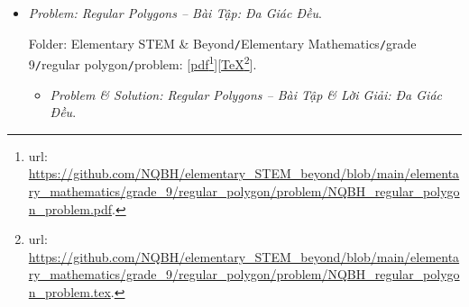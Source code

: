 \documentclass[12pt]{article}
\begin{document}
\begin{itemize}
	Folder: {\sf Elementary STEM \& Beyond{\tt/}Elementary Mathematics{\tt/}grade 9{\tt/}circumcircle \& incircle{\tt/}problem}: [\href{https://github.com/NQBH/elementary_STEM_beyond/blob/main/elementary_mathematics/grade_9/circumcircle_incircle/problem/NQBH_circumcircle_incircle_problem.pdf}{pdf}\footnote{{\sc url}: \url{https://github.com/NQBH/elementary_STEM_beyond/blob/main/elementary_mathematics/grade_9/circumcircle_incircle/problem/NQBH_circumcircle_incircle_problem.pdf}.}][\href{https://github.com/NQBH/elementary_STEM_beyond/blob/main/elementary_mathematics/grade_9/circumcircle_incircle/problem/NQBH_circumcircle_incircle_problem.tex}{\TeX}\footnote{{\sc url}: \url{https://github.com/NQBH/elementary_STEM_beyond/blob/main/elementary_mathematics/grade_9/circumcircle_incircle/problem/NQBH_circumcircle_incircle_problem.tex}.}].
	\begin{itemize}
		\item {\it Problem \& Solution: Circumcircle \& Incircle -- Bài Tập \& Lời Giải: Đường Tròn Ngoại Tiếp \& Đường Tròn Nội Tiếp}.
		
		Folder: {\sf Elementary STEM \& Beyond{\tt/}Elementary Mathematics{\tt/}grade 9{\tt/}circumcircle \& incircle{\tt/}solution}: [\href{https://github.com/NQBH/elementary_STEM_beyond/blob/main/elementary_mathematics/grade_9/circumcircle_incircle/solution/NQBH_circumcircle_incircle_solution.pdf}{pdf}\footnote{{\sc url}: \url{https://github.com/NQBH/elementary_STEM_beyond/blob/main/elementary_mathematics/grade_9/circumcircle_incircle/solution/NQBH_circumcircle_incircle_solution.pdf}.}][\href{https://github.com/NQBH/elementary_STEM_beyond/blob/main/elementary_mathematics/grade_9/circumcircle_incircle/solution/NQBH_circumcircle_incircle_solution.tex}{\TeX}\footnote{{\sc url}: \url{https://github.com/NQBH/elementary_STEM_beyond/blob/main/elementary_mathematics/grade_9/circumcircle_incircle/solution/NQBH_circumcircle_incircle_solution.tex}.}].
	\end{itemize}
	\item {\it Problem: Regular Polygons -- Bài Tập: Đa Giác Đều}.
	
	Folder: {\sf Elementary STEM \& Beyond{\tt/}Elementary Mathematics{\tt/}grade 9{\tt/}regular polygon{\tt/}problem}: [\href{https://github.com/NQBH/elementary_STEM_beyond/blob/main/elementary_mathematics/grade_9/regular_polygon/problem/NQBH_regular_polygon_problem.pdf}{pdf}\footnote{{\sc url}: \url{https://github.com/NQBH/elementary_STEM_beyond/blob/main/elementary_mathematics/grade_9/regular_polygon/problem/NQBH_regular_polygon_problem.pdf}.}][\href{https://github.com/NQBH/elementary_STEM_beyond/blob/main/elementary_mathematics/grade_9/regular_polygon/problem/NQBH_regular_polygon_problem.tex}{\TeX}\footnote{{\sc url}: \url{https://github.com/NQBH/elementary_STEM_beyond/blob/main/elementary_mathematics/grade_9/regular_polygon/problem/NQBH_regular_polygon_problem.tex}.}].
	\begin{itemize}
		\item {\it Problem \& Solution: Regular Polygons -- Bài Tập \& Lời Giải: Đa Giác Đều}.
		

\end{itemize}
\end{itemize}
\end{document}
